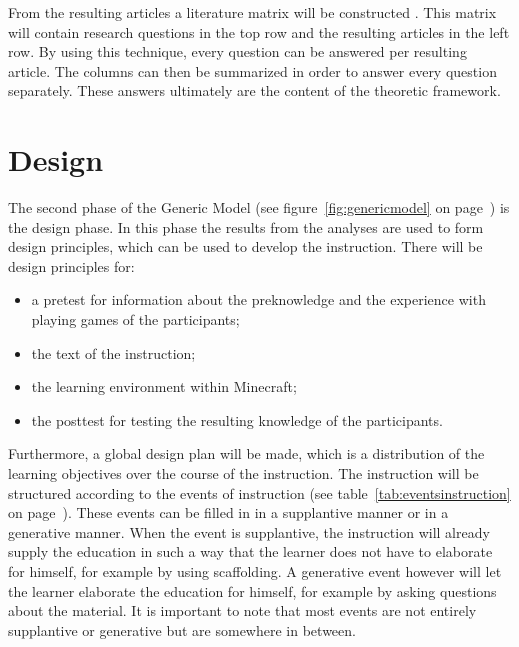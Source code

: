 \documentclass[12pt]{report} %
\begin{document}
From the resulting articles a literature matrix will be constructed \cite{lerencomm}. This matrix will contain research questions in the top row and the resulting articles in the left row. By using this technique, every question can be answered per resulting article. The columns can then be summarized in order to answer every question separately. These answers ultimately are the content of the theoretic framework.

\section{Design}

The second phase of the Generic Model \cite{genericmodel} (see figure~\ref{fig:genericmodel} on page~\pageref{fig:genericmodel}) is the design phase. In this phase the results from the analyses are used to form design principles, which can be used to develop the instruction. There will be design principles for:
\begin{itemize}
\item a pretest for information about the preknowledge and the experience with playing games of the participants;
\item the text of the instruction;
\item the learning environment within Minecraft;
\item the posttest for testing the resulting knowledge of the participants.
\end{itemize}
Furthermore, a global design plan will be made, which is a distribution of the learning objectives over the course of the instruction. The instruction will be structured according to the events of instruction \cite{smithragan} (see table~\ref{tab:eventsinstruction} on page~\pageref{tab:eventsinstruction}). These events can be filled in in a supplantive manner or in a generative manner. When the event is supplantive, the instruction will already supply the education in such a way that the learner does not have to elaborate for himself, for example by using scaffolding. A generative event however will let the learner elaborate the education for himself, for example by asking questions about the material. It is important to note that most events are not entirely supplantive or generative but are somewhere in between.
\end{document}
